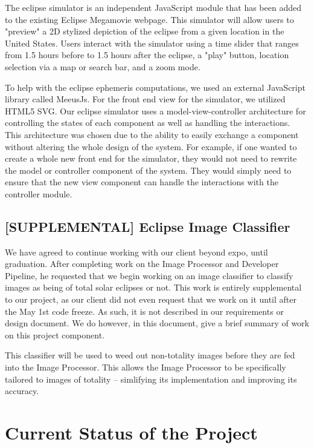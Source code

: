 \documentclass[10pt, onecolumn, draftclsnofoot, letterpaper, compsoc]{IEEEtran}
\begin{document}
The eclipse simulator is an independent JavaScript module that has been
added to the existing Eclipse Megamovie webpage. This simulator will allow
users to "preview" a 2D stylized depiction of the eclipse from a given location
in the United States. Users interact with the simulator using a time slider
that ranges from 1.5 hours before to 1.5 hours after the eclipse, a "play" button,
location selection via a map or search bar, and a zoom mode.

To help with the eclipse ephemeris computations, we used an external
JavaScript library called MeeusJs. For the front end view for the simulator,
we utilized HTML5 SVG. Our eclipse simulator uses a model-view-controller 
architecture for controlling the states of each component as well as handling
the interactions. This architecture was chosen due to the ability to easily
exchange a component without altering the whole design of the system. For
example, if one wanted to create a whole new front end for the simulator,
they would not need to rewrite the model or controller component of the system.
They would simply need to ensure that the new view component can handle the
interactions with the controller module. \\

\subsection{[SUPPLEMENTAL] Eclipse Image Classifier}

We have agreed to continue working with our client beyond expo, until graduation.
After completing work on the Image Processor and Developer Pipeline, he
requested that we begin working on an image classifier to classify images as being of
total solar eclipses or not. This work is entirely supplemental to our project, as
our client did not even request that we work on it until after the May 1st code freeze.
As such, it is not described in our requirements or design document. We do however, in this
document, give a brief summary of work on this project component.

This classifier will be used to weed out non-totality images before they are fed into the
Image Processor. This allows the Image Processor to be specifically tailored to images
of totality -- simlifying its implementation and improving its accuracy. \\

\section{Current Status of the Project}
\end{document}
